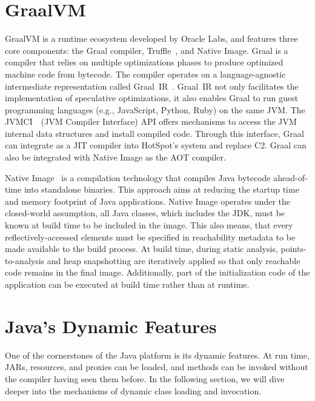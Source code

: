 \section{GraalVM}
GraalVM is a runtime ecosystem developed by Oracle Labs, and features three core components: the Graal compiler, Truffle~\cite{noauthor_truffle_nodate}, and Native Image.
Graal is a compiler that relies on multiple optimizations phases to produce optimized machine code from bytecode. The compiler operates on a language-agnostic intermediate representation called Graal~IR~\cite{duboscq_graal_nodate}. Graal~IR not only facilitates the implementation of speculative optimizations, it also enables Graal to run guest programming languages (e.g., JavaScript, Python, Ruby) on the same JVM. 
The JVMCI~\cite{noauthor_jep_nodate}~(JVM Compiler Interface) API offers mechanisms to access the JVM internal data structures and install compiled code. Through this interface, Graal can integrate as a JIT compiler into HotSpot's system and replace C2. 
Graal can also be integrated with Native Image as the AOT compiler.

Native Image~\cite{wimmer_initialize_2019} is a compilation technology that compiles Java bytecode ahead-of-time into standalone binaries. This approach aims at reducing the startup time and memory footprint of Java applications. Native Image operates under the closed-world assumption, all Java classes, which includes the JDK, must be known at build time to be included in the image.
This also means, that every reflectively-accessed elements must be specified in reachability metadata to be made available to the build process. 
At build time, during static analysis, points-to-analysis and heap snapshotting are iteratively applied so that only reachable code remains in the final image. Additionally, part of the initialization code of the application can be executed at build time rather than at runtime.

\section{Java's Dynamic Features}
One of the cornerstones of the Java platform is its dynamic features. At run time, JARs, resources, and proxies can be loaded, and methods can be invoked without the compiler having seen them before. In the following section, we will dive deeper into the mechanisms of dynamic class loading and invocation.

